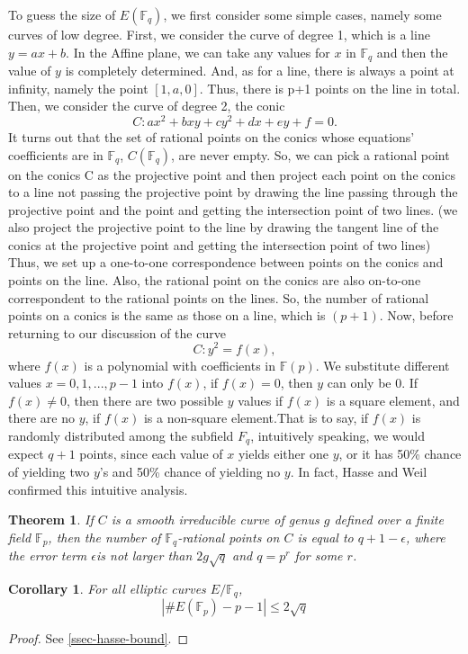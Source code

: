 \documentclass[12pt]{article}
\newtheorem{theorem}{Theorem}[subsection]
\newtheorem{corollary}{Corollary}[subsection]
\theoremstyle{remark}
\theoremstyle{definition}
\newcommand{\F}[0]{\mathbb{F}}
\begin{document}
    To guess the size of $E(\F_q)$, we first consider some simple cases, namely some curves of low degree. First, we consider the curve of degree 1, which is a line $y=ax+b$. In the Affine plane, we can take any values for $x$ in $\F_q$ and then the value of $y$ is completely determined. And, as for a line, there is always a point at infinity, namely the point $[1,a,0].$ Thus, there is p+1 points on the line in total. Then, we consider the curve of degree 2, the conic $$C: ax^2+bxy+cy^2+dx+ey+f=0.$$ It turns out that the set of rational points on the conics whose equations' coefficients are in $\F_q$, $C(\F_q)$, are never empty. So, we can pick a rational point on the conics C as the projective point and then project each point on the conics to a line not passing the projective point by drawing the line passing through the projective point and the point and getting the intersection point of two lines. (we also project the projective point to the line by drawing the tangent line of the conics at the projective point and getting the intersection point of two lines) Thus, we set up a one-to-one correspondence between points on the conics and points on the line. Also, the rational point on the conics are also on-to-one correspondent to the rational points on the lines. So, the number of rational points on a conics is the same as those on a line, which is $(p+1).$
    Now, before returning to our discussion of the curve $$C:y^2=f(x),$$ where $f(x)$ is a polynomial with coefficients in $\F(p)$. We substitute different values $x=0,1,...,p-1$ into $f(x)$, if $f(x)=0$, then $y$ can only be 0. If $f(x)\neq0$, then there are two possible $y$ values if $f(x)$ is a square element, and there are no $y$, if $f(x)$ is a non-square element.That is to say, if $f(x)$ is randomly distributed among the subfield $F_q$, intuitively speaking, we would expect $q+1$ points, since each value of $x$ yields either one $y$, or it has 50\% chance of yielding two $y$'s and 50\% chance of yielding no $y$. 
    In fact, Hasse and Weil confirmed this intuitive analysis. 
    \begin{theorem}\label{theorem-hasse-weil}
        If $C$ is a smooth irreducible curve of genus $g$ defined over a finite field $\F_p$, then the number of $\F_{q}$-rational points on $C$ is equal to $q+1-\epsilon$, where the error term $\epsilon$is not larger than $2g\sqrt{q}$ and $q=p^r$ for some $r$.
    \end{theorem}
    \begin{corollary}\label{Hasse-Weil}
        For all elliptic curves $E/\F_q$,
        \[|\#E(\F_p)-p-1| \leqslant 2 \sqrt{q}\]
    \end{corollary}
    \begin{proof}
        See \autoref{ssec-hasse-bound}.
    \end{proof}
    
\end{document}
